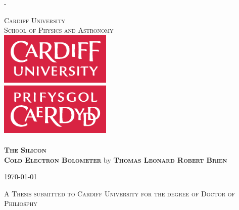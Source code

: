

\pagestyle{empty}

\calccentering{\unitlength}
\begin{adjustwidth*}{\unitlength}{-\unitlength}

\noindent
\vfill
\begin{center}
    {\Large\scshape
    Cardiff University\\
    School of Physics and Astronomy}
\\[2cm]
\includegraphics[width = 0.4\textwidth]{figures/CU_logo}\\[-1.5em]~
\\[1.3cm]
    {\Huge\bfseries\scshape
    The Silicon\\[0.2em]Cold Electron Bolometer}
\vfill \vfill %
    {\Large
    by}
\vfill \vfill %
    {\huge\bfseries\scshape
    Thomas Leonard Robert Brien}
\end{center}

\vfill\vfill

\begin{center}
\large
    \frontdate\today
\end{center}

\vfill\vfill

\begin{center}
	{\Large\scshape
	A Thesis submitted to Cardiff University for the degree of Doctor of Philiosphy}
\end{center}
\vfill

%					

\end{adjustwidth*}
\clearpage


